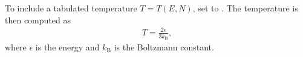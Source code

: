 \documentclass[letterpaper,10pt,english]{sphinxmanual}
\begin{document}
\begin{sphinxVerbatim}[commandchars=\\\{\},formatcom=\scriptsize]
  \PYG{p}{[}
       
        
       
       
       
         
         
  \PYG{p}{]}
\end{sphinxVerbatim}

\sphinxAtStartPar
{}

\sphinxAtStartPar
To include a tabulated temperature \(T = T(E,N)\), set  to .
The temperature is then computed as
\begin{equation*}
\begin{split}T = \frac{2 \epsilon}{3k_{\textrm{B}}},\end{split}
\end{equation*}
\sphinxAtStartPar
where \(\epsilon\) is the energy and \(k_{\textrm{B}}\) is the Boltzmann constant.
\end{document}

